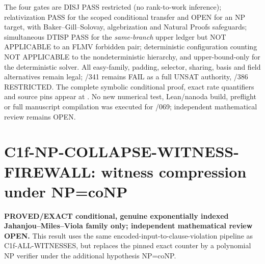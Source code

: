 \documentclass[11pt]{article}
\begin{document}
The four gates are DISJ PASS restricted (no rank-to-work
inference); relativization PASS for the scoped conditional
transfer and OPEN for an NP target, with
Baker--Gill--Solovay, algebrization and Natural Proofs
safeguards; simultaneous DTISP PASS for the
\emph{same-branch} upper ledger but NOT APPLICABLE to
an FLMV forbidden pair; deterministic configuration
counting NOT APPLICABLE to the nondeterministic
hierarchy, and upper-bound-only for the deterministic
solver. All easy-family, padding, selector, sharing,
basis and field alternatives remain legal; /341
remains FAIL as a full UNSAT authority, /386
RESTRICTED. The complete symbolic conditional proof,
exact rate quantifiers and source pins appear at
.
No new numerical test, Lean/nanoda build, preflight or
full manuscript compilation was executed for /069;
independent mathematical review remains OPEN.

\section{C1f-NP-COLLAPSE-WITNESS-FIREWALL: witness compression under NP=coNP}
\textbf{PROVED/EXACT conditional, genuine exponentially indexed
Jahanjou--Miles--Viola family only; independent mathematical review OPEN.}
This result uses the same encoded-input-to-clause-violation pipeline as
C1f-ALL-WITNESSES, but replaces the pinned exact counter by a polynomial
NP verifier under the additional hypothesis NP=coNP.
\end{document}

